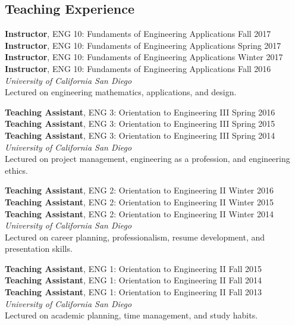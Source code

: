 \documentclass[]{res}
\begin{document}
\begin{resume}
\section{Teaching Experience}
\vspace{0.1in}

\textbf{Instructor}, ENG 10: Fundaments of Engineering Applications \hfill Fall 2017 \\
\textbf{Instructor}, ENG 10: Fundaments of Engineering Applications \hfill Spring 2017 \\
\textbf{Instructor}, ENG 10: Fundaments of Engineering Applications \hfill Winter 2017 \\
\textbf{Instructor}, ENG 10: Fundaments of Engineering Applications \hfill Fall 2016 \\
\textit{University of California San Diego} \\
Lectured on engineering mathematics, applications, and design.

\textbf{Teaching Assistant}, ENG 3: Orientation to Engineering III \hfill Spring 2016 \\
\textbf{Teaching Assistant}, ENG 3: Orientation to Engineering III \hfill Spring 2015 \\
\textbf{Teaching Assistant}, ENG 3: Orientation to Engineering III \hfill Spring 2014 \\
\textit{University of California San Diego} \\
Lectured on project management, engineering as a profession, and engineering ethics.

\textbf{Teaching Assistant}, ENG 2: Orientation to Engineering II \hfill Winter 2016 \\
\textbf{Teaching Assistant}, ENG 2: Orientation to Engineering II \hfill Winter 2015 \\
\textbf{Teaching Assistant}, ENG 2: Orientation to Engineering II \hfill Winter 2014 \\
\textit{University of California San Diego} \\
Lectured on career planning, professionalism, resume development, and presentation skills.

\textbf{Teaching Assistant}, ENG 1: Orientation to Engineering II \hfill Fall 2015 \\
\textbf{Teaching Assistant}, ENG 1: Orientation to Engineering II \hfill Fall 2014 \\
\textbf{Teaching Assistant}, ENG 1: Orientation to Engineering II \hfill Fall 2013 \\
\textit{University of California San Diego} \\
Lectured on academic planning, time management, and study habits.




\end{resume}
\end{document}
